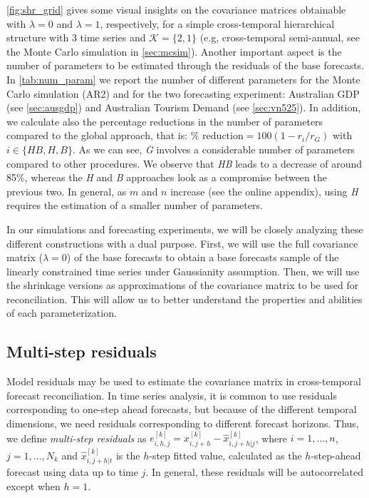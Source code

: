 \documentclass[12pt]{article}
\theoremstyle{definition}
\begin{document}
\autoref{fig:shr_grid} gives some visual insights on the covariance matrices obtainable with $\lambda=0$ and $\lambda=1$, respectively, for a simple cross-temporal hierarchical structure with 3 time series and $\mathcal{K}=\{2,1\}$ (e.g, cross-temporal semi-annual, see the Monte Carlo simulation in \autoref{sec:mcsim}). Another important aspect is the number of parameters to be estimated through the residuals of the base forecasts. In \autoref{tab:num_param} we report the number of different parameters for the Monte Carlo simulation (AR2) and for the two forecasting experiment: Australian GDP (see \autoref{sec:ausgdp}) and Australian Tourism Demand (see \autoref{sec:vn525}). In addition, we calculate also the percentage reductions in the number of parameters compared to the global approach, that is: $\% \text{ reduction} = 100(1-r_i/r_G)$ with $i \in \{\textit{HB}, H, B\}$. As we can see, \textit{G} involves a considerable number of parameters compared to other procedures. We observe that \textit{HB} leads to a decrease of around 85\%, whereas the \textit{H} and \textit{B} approaches look as a compromise between the previous two. In general, as $m$ and $n$ increase (see the online appendix), using \textit{H} requires the estimation of a smaller number of parameters.

In our simulations and forecasting experiments, we will be closely analyzing these different constructions with a dual purpose. First, we will use the full covariance matrix ($\lambda = 0$) of the base forecasts to obtain a base forecasts sample of the linearly constrained time series under Gaussianity assumption. Then, we will use the shrinkage versions as approximations of the covariance matrix to be used for reconciliation. This will allow us to better understand the properties and abilities of each parameterization.


\subsection{Multi-step residuals} \label{ssec:multi_res}

Model residuals may be used to estimate the covariance matrix in cross-temporal forecast reconciliation. In time series analysis, it is common to use residuals corresponding to one-step ahead forecasts, but because of the different temporal dimensions, we need residuals corresponding to different forecast horizons. Thus, we define \textit{multi-step residuals} as $e_{i,h,j}^{[k]} = x_{i,j+h}^{[k]} - \widehat{x}_{i,j+h|j}^{[k]}$, where $i = 1,\dots,n$, $j = 1,\dots,N_k$ and $\widehat{x}_{i,j+h|t}^{[k]}$ is the $h$-step fitted value, calculated as the $h$-step-ahead forecast using data up to time $j$. In general, these residuals will be autocorrelated except when $h=1$.
\end{document}
